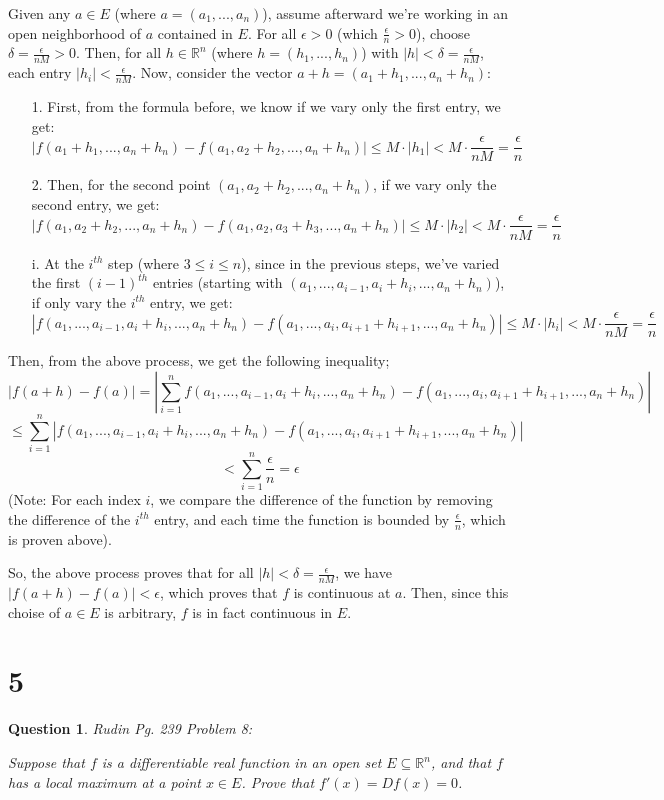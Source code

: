 \documentclass{article}
\newtheorem{question}{Question}
\begin{document}
Given any $a\in E$ (where $a=(a_1,...,a_n)$), assume afterward we're working in an open neighborhood of $a$ contained in $E$. For all $\epsilon>0$ (which $\frac{\epsilon}{n}>0$), choose $\delta=\frac{\epsilon}{nM}>0$.
Then, for all $h\in\mathbb{R}^n$ (where $h=(h_1,...,h_n)$) with $|h|<\delta=\frac{\epsilon}{nM}$,  each entry $|h_i|<\frac{\epsilon}{nM}$. Now, consider the vector $a+h=(a_1+h_1,...,a_n+h_n)$:
\begin{itemize}
    \item[1.] First, from the formula before, we know if we vary only the first entry, we get:
    $$|f(a_1+h_1,...,a_n+h_n)-f(a_1,a_2+h_2,...,a_n+h_n)|\leq M\cdot |h_1| < M\cdot \frac{\epsilon}{nM} = \frac{\epsilon}{n}$$
    \item[2.] Then, for the second point $(a_1,a_2+h_2,...,a_n+h_n)$, if we vary only the second entry, we get:
    $$|f(a_1,a_2+h_2,...,a_n+h_n)-f(a_1,a_2,a_3+h_3,...,a_n+h_n)|\leq M\cdot|h_2|<M\cdot\frac{\epsilon}{nM}=\frac{\epsilon}{n}$$
    \item[i.] At the $i^{th}$ step (where $3\leq i\leq n$), since in the previous steps, we've varied the first $(i-1)^{th}$ entries (starting with $(a_1,...,a_{i-1},a_i+h_i,...,a_n+h_n)$), if only vary the $i^{th}$ entry, we get:
    $$|f(a_1,...,a_{i-1},a_i+h_i,...,a_n+h_n)-f(a_1,...,a_i,a_{i+1}+h_{i+1},...,a_n+h_n)| \leq M\cdot|h_i|<M\cdot\frac{\epsilon}{nM}=\frac{\epsilon}{n}$$
\end{itemize}
Then, from the above process, we get the following inequality;
$$|f(a+h)-f(a)|=\left|
\sum_{i=1}^{n}f(a_1,...,a_{i-1},a_i+h_i,...,a_n+h_n)-f(a_1,...,a_i,a_{i+1}+h_{i+1},...,a_n+h_n)
\right|$$
$$\leq \sum_{i=1}^{n}|f(a_1,...,a_{i-1},a_i+h_i,...,a_n+h_n)-f(a_1,...,a_i,a_{i+1}+h_{i+1},...,a_n+h_n)|$$
$$< \sum_{i=1}^{n}\frac{\epsilon}{n}=\epsilon$$
(Note: For each index $i$, we compare the difference of the function by removing the difference of the $i^{th}$ entry, and each time the function is bounded by $\frac{\epsilon}{n}$, which is proven above).

So, the above process proves that for all $|h|<\delta=\frac{\epsilon}{nM}$, we have $|f(a+h)-f(a)|<\epsilon$, which proves that $f$ is continuous at $a$.
Then, since this choise of $a\in E$ is arbitrary, $f$ is in fact continuous in $E$.

\break

\section*{5}
\begin{myBox}[]{}
    \begin{question}
        Rudin Pg. 239 Problem 8:

        Suppose that $f$ is a differentiable real function in an open set $E\subseteq \mathbb{R}^n$, 
        and that $f$ has a local maximum at a point $x\in E$. Prove that $f'(x)=Df(x)=0$.
    \end{question}
\end{myBox}
\end{document}
